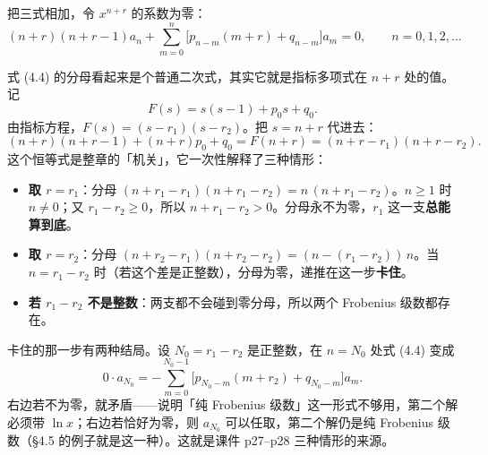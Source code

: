 \documentclass[11pt]{ctexart}
\let\origsubhdr\subhdr
\renewcommand{\subhdr}[1]{\needspace{3\baselineskip}\origsubhdr{#1}}
\begin{document}
把三式相加，令 $x^{n+r}$ 的系数为零：
\[
(n+r)(n+r-1)a_n+\sum_{m=0}^{n}\bigl[p_{n-m}(m+r)+q_{n-m}\bigr]a_m=0,
\qquad n=0,1,2,\dots \tag{4.2}
\]





式 (4.4) 的分母看起来是个普通二次式，其实它就是指标多项式在 $n+r$ 处的值。记
\[
F(s)=s(s-1)+p_0s+q_0 .
\]
由指标方程，$F(s)=(s-r_1)(s-r_2)$。把 $s=n+r$ 代进去：
\[
(n+r)(n+r-1)+(n+r)p_0+q_0=F(n+r)=(n+r-r_1)(n+r-r_2). \tag{4.5}
\]
这个恒等式是整章的「机关」，它一次性解释了三种情形：

\begin{itemize}
  \item \textbf{取 $r=r_1$}：分母 $(n+r_1-r_1)(n+r_1-r_2)=n\,(n+r_1-r_2)$。$n\geq1$ 时 $n\neq0$；又 $r_1-r_2\geq0$，所以 $n+r_1-r_2>0$。分母永不为零，$r_1$ 这一支\textbf{总能算到底}。
  \item \textbf{取 $r=r_2$}：分母 $(n+r_2-r_1)(n+r_2-r_2)=(n-(r_1-r_2))\,n$。当 $n=r_1-r_2$ 时（若这个差是正整数），分母为零，递推在这一步\textbf{卡住}。
  \item \textbf{若 $r_1-r_2$ 不是整数}：两支都不会碰到零分母，所以两个 Frobenius 级数都存在。
\end{itemize}

卡住的那一步有两种结局。设 $N_0=r_1-r_2$ 是正整数，在 $n=N_0$ 处式 (4.4) 变成
\[
0\cdot a_{N_0}=-\sum_{m=0}^{N_0-1}\bigl[p_{N_0-m}(m+r_2)+q_{N_0-m}\bigr]a_m .
\]
右边若不为零，就矛盾——说明「纯 Frobenius 级数」这一形式不够用，第二个解必须带 $\ln x$；右边若恰好为零，则 $a_{N_0}$ 可以任取，第二个解仍是纯 Frobenius 级数（§4.5 的例子就是这一种）。这就是课件 p27--p28 三种情形的来源。
\end{document}

